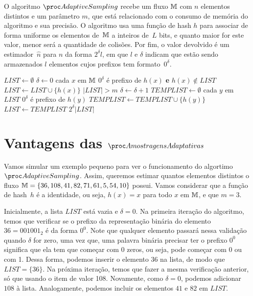 O algoritmo $\AS$ recebe um fluxo $\mathbb{M}$ com $n$ elementos distintos e um parâmetro $m$, que está relacionado com o 
consumo de memória do algoritmo e sua precisão. O algoritmo usa uma função de hash $h$ para associar de forma uniforme 
os elementos de~$\mathbb{M}$ a inteiros de~$L$ bits, e quanto maior for este valor, menor será a quantidade de colisões. Por 
fim, o valor devolvido é um estimador~$\hat{n}$ para $n$ da forma $2^{\delta} l$, em que $l$ e $\delta$ indicam que 
estão sendo armazenados $l$ elementos cujos prefixos tem formato~$0^{\delta}$. 

\begin{codebox}
  \li $LIST \gets \emptyset$
  \li $\delta \gets 0$
  \li \For cada $x$ em $\mathbb{M}$ 
  \li    \Do 
         \If $0^{\delta}$ é prefixo de $h(x)$ \textbf{e} $h(x) \not\in LIST$
  \li             \Then $LIST \gets LIST \cup \{ h(x) \}$
         \End
  \li    \While $|LIST| > m$                                   \label{li:as:while}
  \li    \Do
         $\delta \gets \delta + 1$
  \li    $TEMPLIST \gets \emptyset$
  \li    \For cada $y$ em $LIST$
  \li    \Do
            \If $0^{\delta}$ é prefixo de $h(y)$
  \li       \Then $TEMPLIST \gets TEMPLIST \cup \{ h(y) \}$
            \End
         \End
  \li    $LIST \gets TEMPLIST$
         \End 
      \End
  \li
  \Return $2^{\delta} |LIST|$   
  \End
\end{codebox}


\section{Vantagens das $\asampling$}
\label{lab:chapter:04:02}

Vamos simular um exemplo pequeno para ver o funcionamento do algortimo $\AS$. Assim, queremos estimar quantos elementos 
distintos o fluxo $\mathbb{M} = \{ 36, 108, 41, 82, 71, 61, 5, 54, 10 \}$ possui. Vamos considerar que a função de hash~$h$ é
a identidade, ou seja, $h(x) = x$ para todo $x$ em $\mathbb{M}$, e que $m = 3$. 

Inicialmente, a lista $LIST$ está vazia e $\delta = 0$. Na primeira iteração do algoritmo, temos que verificar se o 
prefixo da representação binária do elemento $36 = 001001_2$ é da forma $0^0$. Note que qualquer elemento passará nessa 
validação quando $\delta$ for zero, uma vez que, uma palavra binária precisar ter o prefixo $0^0$ significa que ela tem 
que começar com 0 zeros, ou seja, pode começar com 0 ou com 1. Dessa forma, podemos inserir o elemento $36$ na lista, de 
modo que $LIST = \{ 36 \}$. Na próxima iteração, temos que fazer a mesma verificação anterior, só que usando o item de 
valor 108. Novamente, como $\delta = 0$, podemos adicionar $108$ à lista. Analogamente, podemos incluir os elementos 
$41$ e $82$ em $LIST$. 

